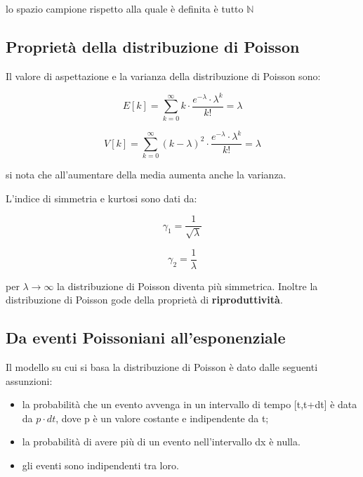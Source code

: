 \documentclass[11pt,a4paper]{book}
\begin{document}
lo spazio campione rispetto alla quale \`{e} definita \`{e} tutto $\mathbb{N}$



\subsection{Propriet\`{a} della distribuzione di Poisson}

Il valore di aspettazione e la varianza della distribuzione di Poisson sono:

\begin{equation}
	E[k] = \sum_{k=0}^{\infty}k \cdot \dfrac{e^{-\lambda} \cdot \lambda^k}{k!} = \lambda 
\end{equation}

\begin{equation}
	V[k] = \sum_{k=0}^{\infty} (k - \lambda)^2 \cdot \dfrac{e^{-\lambda} \cdot \lambda^k}{k!} = \lambda 
\end{equation}

si nota che all'aumentare della media aumenta anche la varianza. \newline

L'indice di simmetria e kurtosi sono dati da:

\begin{equation}
	\gamma_1 = \dfrac{1}{\sqrt{\lambda}}
\end{equation}

\begin{equation}
	\gamma_2 = \frac{1}{\lambda}
\end{equation}

per $\lambda \rightarrow \infty $ la distribuzione di Poisson diventa pi\`{u} simmetrica. Inoltre la distribuzione di Poisson gode della propriet\`{a} di \textbf{riproduttivit\`{a}}.


\subsection{Da eventi Poissoniani all'esponenziale}

Il modello su cui si basa la distribuzione di Poisson \`{e} dato dalle seguenti assunzioni:

\begin{itemize}
	\item la probabilit\`{a} che un evento avvenga in un intervallo di tempo [t,t+dt] \`{e} data da $p\cdot dt$, dove p \`{e} un valore costante e indipendente da t;
	\item la probabilit\`{a} di avere pi\`{u} di un evento nell'intervallo dx \`{e} nulla.
	\item gli eventi sono indipendenti tra loro.
\end{itemize}
\end{document}
